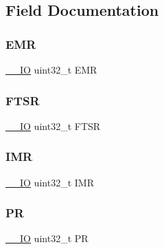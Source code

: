 \subsection{Field Documentation}
\mbox{\label{struct_e_x_t_i___type_def_a6034c7458d8e6030f6dacecf0f1a3a89}} 
\subsubsection{\texorpdfstring{EMR}{EMR}}
{\footnotesize\ttfamily \mbox{\hyperlink{core__sc300_8h_aec43007d9998a0a0e01faede4133d6be}{\+\_\+\+\_\+\+IO}} uint32\+\_\+t E\+MR}

\mbox{\label{struct_e_x_t_i___type_def_aa0f7c828c46ae6f6bc9f66f11720bbe6}} 
\subsubsection{\texorpdfstring{FTSR}{FTSR}}
{\footnotesize\ttfamily \mbox{\hyperlink{core__sc300_8h_aec43007d9998a0a0e01faede4133d6be}{\+\_\+\+\_\+\+IO}} uint32\+\_\+t F\+T\+SR}

\mbox{\label{struct_e_x_t_i___type_def_ae845b86e973b4bf8a33c447c261633f6}} 
\subsubsection{\texorpdfstring{IMR}{IMR}}
{\footnotesize\ttfamily \mbox{\hyperlink{core__sc300_8h_aec43007d9998a0a0e01faede4133d6be}{\+\_\+\+\_\+\+IO}} uint32\+\_\+t I\+MR}

\mbox{\label{struct_e_x_t_i___type_def_af8d25514079514d38c104402f46470af}} 
\subsubsection{\texorpdfstring{PR}{PR}}
{\footnotesize\ttfamily \mbox{\hyperlink{core__sc300_8h_aec43007d9998a0a0e01faede4133d6be}{\+\_\+\+\_\+\+IO}} uint32\+\_\+t PR}

